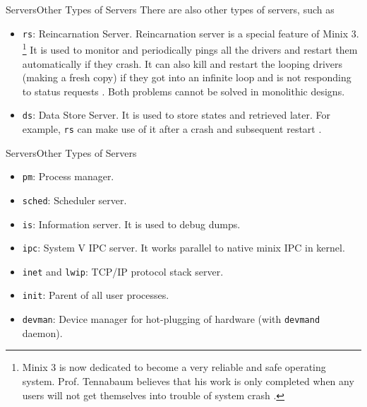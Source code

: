 \documentclass[12pt]{beamer}
\begin{document}
\begin{frame}{Servers}{Other Types of Servers}
There are also other types of servers, such as \cite{srvdrvoverview}
\begin{itemize}
    \item \texttt{rs}: Reincarnation Server. Reincarnation server is a special feature of Minix 3. \footnote{Minix 3 is now dedicated to become a very reliable and safe operating system. Prof. Tennabaum believes that his work is only completed when any users will not get themselves into trouble of system crash \cite{mos4chn}.} It is used to monitor and periodically pings all the drivers and restart them automatically if they crash. It can also kill and restart the looping drivers (making a fresh copy) if they got into an infinite loop and is not responding to status requests \cite{minix3wikipedia}. Both problems cannot be solved in monolithic designs.
    \item \texttt{ds}: Data Store Server. It is used to store states and retrieved later. For example, \texttt{rs} can make use of it after a crash and subsequent restart \cite{ds}.
\end{itemize}
\end{frame}
\begin{frame}{Servers}{Other Types of Servers}
\begin{itemize}
    \item \texttt{pm}: Process manager.
    \item \texttt{sched}: Scheduler server.
    \item \texttt{is}: Information server. It is used to debug dumps.
    \item \texttt{ipc}: System V IPC server. It works parallel to native minix IPC in kernel.
    \item \texttt{inet} and \texttt{lwip}: TCP/IP protocol stack server.
    \item \texttt{init}: Parent of all user processes.
    \item \texttt{devman}: Device manager for hot-plugging of hardware (with \texttt{devmand} daemon).
\end{itemize}
\end{frame}
\end{document}
